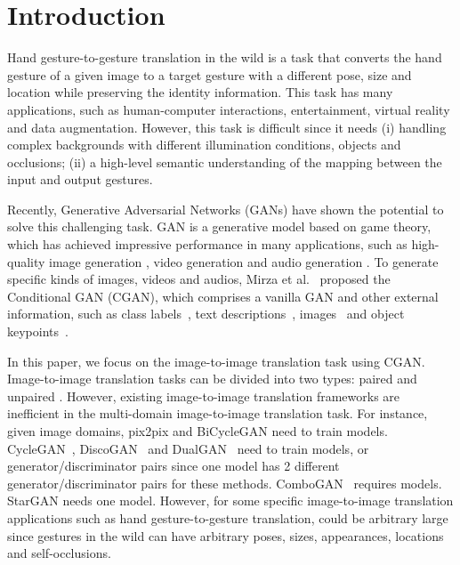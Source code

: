 \documentclass[sigconf]{acmart}
\begin{document}


\maketitle


\section{Introduction}

Hand gesture-to-gesture translation in the wild is a task that converts the hand gesture of a given image to a target gesture with a different pose, size and location while preserving the identity information.
This task has many applications, such as human-computer interactions, entertainment, virtual reality and data augmentation.
However, this task is difficult since it needs (i) handling complex backgrounds with different illumination conditions, objects and occlusions; (ii) a high-level semantic understanding of the mapping between the input and output gestures.

Recently, Generative Adversarial Networks (GANs) \cite{goodfellow2014generative} have shown the potential to solve this challenging task. GAN is a generative model based on game theory, which has achieved impressive performance in many applications, such as high-quality image generation \cite{karras2017progressive}, video generation \cite{yan2017skeleton} and audio generation \cite{oord2016wavenet}.
To generate specific kinds of images, videos and audios,  Mirza et al.~\cite{mirza2014conditional} proposed the Conditional GAN (CGAN), which comprises a vanilla GAN and other external information, such as class labels~\cite{choi2017stargan}, text descriptions~\cite{reed2016learning}, images~ \cite{isola2017image} and object keypoints~\cite{reed2016learning}.

In this paper, we focus on the image-to-image translation task using CGAN.
Image-to-image translation tasks can be divided into two types: paired \cite{isola2017image,ma2017pose,siarohin2017deformable} and unpaired \cite{zhu2017unpaired,yi2017dualgan,anoosheh2017combogan,choi2017stargan}.
However, existing image-to-image translation frameworks are inefficient in the multi-domain image-to-image translation task. 
For instance, given  image domains, pix2pix \cite{isola2017image} and  BiCycleGAN \cite{zhu2017toward} need to train  models.
CycleGAN~\cite{zhu2017unpaired}, DiscoGAN~\cite{kim2017learning} and DualGAN~\cite{yi2017dualgan} need to train  models, or  generator/discriminator pairs since one model has 2 different generator/discriminator pairs for these methods.
ComboGAN~\cite{anoosheh2017combogan} requires  models.
StarGAN \cite{choi2017stargan} needs one model. 
However, for some specific image-to-image translation applications  such as hand gesture-to-gesture translation,  could be arbitrary large since gestures in the wild can have arbitrary poses, sizes, appearances, locations and self-occlusions.
\end{document}
